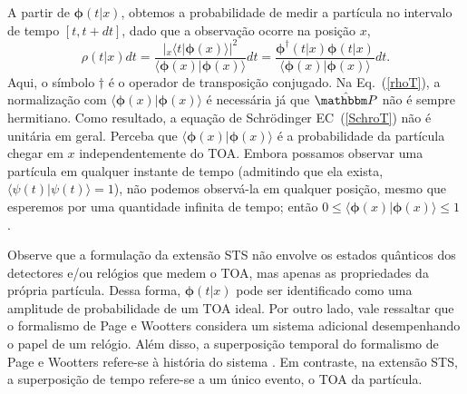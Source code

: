 A partir de $\pmb{\phi}(t|x)$, obtemos a probabilidade de medir a partícula no intervalo de tempo $[t,t+dt]$, dado que a observação ocorre na posição $x$,
\begin{equation}\label{rhoT}
\rho(t|x)dt=\frac{|{_x\langle} t|\pmb{\phi}(x)\rangle|^2}{\langle \pmb{\phi}(x)|\pmb{\phi}(x) \rangle} dt=\frac{\pmb{\phi}^{\dagger}(t|x)\pmb{\phi}(t|x)}{\langle \pmb{\phi}(x)|\pmb{\phi}(x) \rangle}dt.
\end{equation}
Aqui, o símbolo $\dagger$ é o operador de transposição conjugado. Na Eq.~(\ref{rhoT}), a normalização com ${\langle \pmb{\phi}(x)|\pmb{\phi}(x) \rangle}$ é necessária já que ${\hat {\mathbbm P}}$ não é sempre hermitiano. Como resultado, a equação de Schrödinger EC~(\ref{SchroT}) não é unitária em geral. Perceba que ${\langle \pmb{\phi}(x)|\pmb{\phi}(x) \rangle}$ é a probabilidade da partícula chegar em $x$ independentemente do TOA. Embora possamos observar uma partícula em qualquer instante de tempo (admitindo que ela exista, $\langle \psi(t)|\psi(t)\rangle=1$), não podemos observá-la em qualquer posição, mesmo que esperemos por uma quantidade infinita de tempo; então $0 \leq \langle \pmb{\phi}(x)|\pmb{\phi}(x) \rangle \leq 1$ \cite{Ricardo}.



Observe que a formulação da extensão STS não envolve os estados quânticos dos detectores e/ou relógios que medem o TOA, mas apenas as propriedades da própria partícula. Dessa forma, $\pmb{\phi}(t|x)$ pode ser identificado como uma amplitude de probabilidade de um TOA ideal. Por outro lado, vale ressaltar que o formalismo de Page e Wootters considera um sistema adicional desempenhando o papel de um relógio. Além disso, a superposição temporal do formalismo de Page e Wootters refere-se à história do sistema \cite{pagewootters}. Em contraste, na extensão STS, a superposição de tempo refere-se a um único evento, o TOA da partícula.

